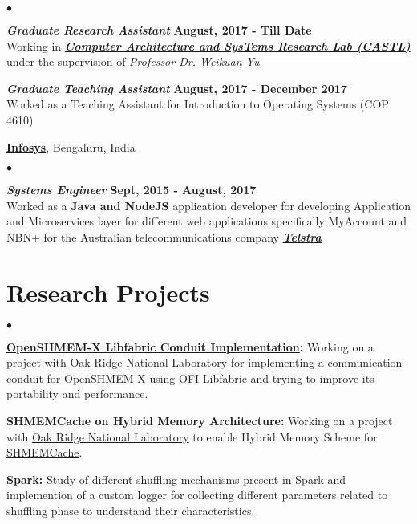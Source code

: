 \documentclass[margin,line]{res}
\newenvironment{list2}{
  \begin{list}{$\bullet$}{%
      \setlength{\itemsep}{0in}
      \setlength{\parsep}{0in} \setlength{\parskip}{0in}
      \setlength{\topsep}{0in} \setlength{\partopsep}{0in} 
      \setlength{\leftmargin}{0.2in}}}{\end{list}}
\begin{document}
\begin{resume}
\begin{list2}
\item \textbf{{\em Graduate Research Assistant}} \hfill {\bf August, 2017 - 
Till 
Date}\\
Working in \textbf{\textit{\href{http://castl.cs.fsu.edu/doku.php/}{Computer 
Architecture and SysTems Research Lab (CASTL)}}} under the supervision of 
\textit{\href{https://www.cs.fsu.edu/~yuw/}{Professor Dr. Weikuan Yu}}

\item \textbf{{\em Graduate Teaching Assistant}} \hfill {\bf August, 2017 - 
December 
2017}\\
Worked as a Teaching Assistant for Introduction to Operating Systems (COP 4610)
\end{list2}
\vspace{-.4cm}

{\bf \href{https://www.infosys.com/}{Infosys}}, Bengaluru, India
\begin{list2}
\item \textbf{{\em Systems Engineer}} \hfill {\bf Sept, 2015 - August, 2017}\\
Worked as a {\bf Java and NodeJS} application developer for developing 
Application and Microservices layer for different web applications specifically 
MyAccount and NBN+ for the Australian telecommunications company
\textbf{\textit{\href{https://www.telstra.com.au/Telstra/}{Telstra}}}
\end{list2}
\vspace*{-.18in}
\section{\sc Research Projects}
\begin{list2}
	\item {\bf 
		\href{https://github.com/ornl-languages/ornl-openshmem/}{OpenSHMEM-X 
			Libfabric 
			Conduit Implementation}:} Working on a project with 
	\href{https://www.ornl.gov/}{Oak Ridge National Laboratory} for 
	implementing a 
	communication conduit for OpenSHMEM-X using OFI Libfabric and trying to 
	improve 
	its portability and performance.
	\item {\bf SHMEMCache on Hybrid Memory Architecture:} Working on a project 
	with 
	\href{https://www.ornl.gov/}{Oak Ridge National Laboratory} to enable 
	Hybrid 
	Memory Scheme for 
	\href{http://ww2.cs.fsu.edu/~fu/files/shmemcache-ccgrid17-paper.pdf}{SHMEMCache}.
	\item {\bf Spark:} Study of different shuffling mechanisms present in 
	Spark 
	and 
	implemention of a custom logger for collecting different parameters related 
	to 
	shuffling phase to understand their characteristics.
\end{list2}


\end{resume}
\end{document}

